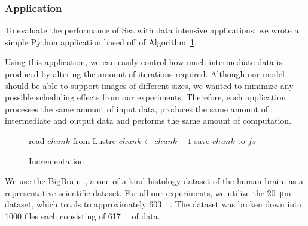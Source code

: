 \documentclass[10pt,journal,compsoc]{IEEEtran}
\makeatletter
\newcommand{\removelatexerror}{\let\@latex@error\@gobble}
\makeatother
\begin{document}
\subsubsection{Application}


      To evaluate the performance of Sea with data intensive applications, we wrote a simple Python
      application based off of Algorithm~\ref{alg:sea-comp:incrementation}.
      
      Using this application, we can easily control how much intermediate data
      is produced by altering the amount of iterations required. Although our
      model should be able to support images of different sizes, we wanted to
      minimize any possible scheduling effects from our experiments. Therefore,
      each application processes the same amount of input data, produces the
      same amount of intermediate and output data and performs the same amount
      of computation.
                                                                                   

      \begin{figure}[!t]
        \removelatexerror
        \begin{algorithm}[H]
          \caption{Incrementation}\label{alg:sea-comp:incrementation}
          \SetAlgoLined {}   { read $chunk$ from Lustre  { $chunk\gets chunk+1$ save $chunk$ to $fs$ } }
        \end{algorithm}
      \end{figure}

      We use the BigBrain~\cite{amunts2013bigbrain}, a one-of-a-kind histology
      dataset of the human brain, as a representative scientific dataset. For
      all our experiments, we utilize the \SI{20}{\micro\meter} dataset, which
      totals to approximately \SI{603}{\gibi\byte}. The dataset was broken down
      into 1000 files each consisting of \SI{617}{\mebi\byte} of data.
      
\end{document}
